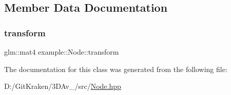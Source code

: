 \subsection{Member Data Documentation}
\mbox{\label{classexample_1_1_node_a98a9bba2771dc273f59d8f1adda2e3e9}} 
\subsubsection{\texorpdfstring{transform}{transform}}
{\footnotesize\ttfamily glm\+::mat4 example\+::\+Node\+::transform\hspace{0.3cm}{\ttfamily [protected]}}



The documentation for this class was generated from the following file\+:\begin{DoxyCompactItemize}
\item 
D\+:/\+Git\+Kraken/3\+D\+Av\+\_/src/\mbox{\hyperlink{_node_8hpp}{Node.\+hpp}}\end{DoxyCompactItemize}
